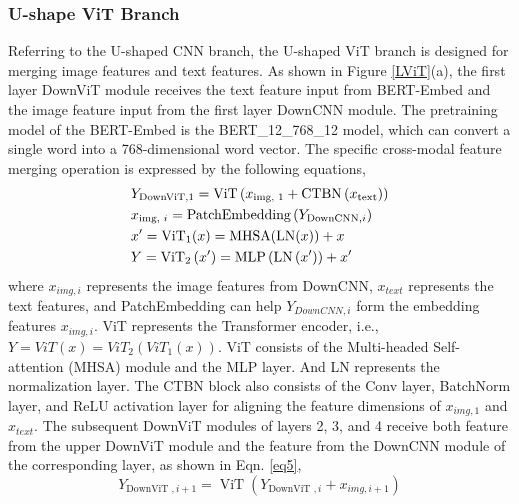 \documentclass[lettersize,journal]{IEEEtran}
\begin{document}
\subsubsection{U-shape ViT Branch}
Referring to the U-shaped CNN branch, the U-shaped ViT branch is designed for merging image features and text features. As shown in Figure \ref{LViT}(a), the first layer DownViT module receives the text feature input from BERT-Embed \cite{56devlin2018bert} and the image feature input from the first layer DownCNN module. The pretraining model of the BERT-Embed is the BERT\_12\_768\_12 model, which can convert a single word into a 768-dimensional word vector. The specific cross-modal feature merging operation is expressed by the following equations,
\vspace{-2mm}
\begin{eqnarray}
    \setlength{\belowdisplayskip}{3pt}    
    &Y_{\text {DownViT}, 1}=\operatorname{ViT}\left(x_{\text {img, } 1}+\operatorname{CTBN}\left(x_{\text {text}}\right)\right)
    \label{eq1}
    \\
    &x_{\text {img, } i}=\text {PatchEmbedding}\left(Y_{\text {DownCNN}, i}\right)
    \label{eq2}
    \\
    &x^{\prime}=\operatorname{ViT}_{1}(x)=\operatorname{MHSA}(\operatorname{LN}(x))+x
    \label{eq3}
    \\
    &Y=\operatorname{ViT}_{2}\left(x^{\prime}\right)=\operatorname{MLP}\left(\operatorname{LN}\left(x^{\prime}\right)\right)+x^{\prime}
    \label{eq4}
    \setlength{\abovedisplayskip}{3pt}
\end{eqnarray}
where $x_{img,i}$ represents the image features from DownCNN, $x_{text}$ represents the text features, and PatchEmbedding can help $Y_{DownCNN,i}$ form the embedding features $x_{img,i}$. ViT represents the Transformer encoder\cite{42dosovitskiy2020image}, i.e., $Y=V i T(x)=V i T_{2}\left(V i T_{1}(x)\right)$. ViT consists of the Multi-headed Self-attention (MHSA) module and the MLP layer. And LN represents the normalization layer. The CTBN block also consists of the Conv layer, BatchNorm layer, and ReLU activation layer for aligning the feature dimensions of $x_{img,1}$ and $x_{text}$. The subsequent DownViT modules of layers 2, 3, and 4 receive both feature from the upper DownViT module and the feature from the DownCNN module of the corresponding layer, as shown in Eqn. \ref{eq5}, 
\begin{equation}
    Y_{\text {DownViT }, i+1}=\operatorname{ViT}\left(Y_{\text {DownViT }, i}+x_{i m g, i+1}\right)
    \label{eq5}
\end{equation}
\end{document}
